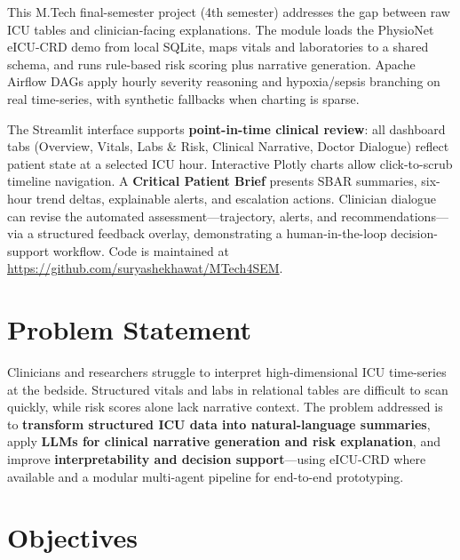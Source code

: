 \documentclass[12pt]{report}
\DeclareRobustCommand{\code}[1]{{\ttfamily\seqsplit{#1}\unskip}}
\begin{document}
This M.Tech final-semester project (4th semester) addresses the gap between raw ICU tables and clinician-facing explanations. The \code{icu\_agents} module loads the PhysioNet eICU-CRD demo from local SQLite, maps vitals and laboratories to a shared \code{PatientState} schema, and runs rule-based risk scoring plus narrative generation. Apache Airflow DAGs apply hourly severity reasoning and hypoxia/sepsis branching on real time-series, with synthetic fallbacks when charting is sparse.

The Streamlit interface supports \textbf{point-in-time clinical review}: all dashboard tabs (Overview, Vitals, Labs \& Risk, Clinical Narrative, Doctor Dialogue) reflect patient state at a selected ICU hour. Interactive Plotly charts allow click-to-scrub timeline navigation. A \textbf{Critical Patient Brief} presents SBAR summaries, six-hour trend deltas, explainable alerts, and escalation actions. Clinician dialogue can revise the automated assessment---trajectory, alerts, and recommendations---via a structured feedback overlay, demonstrating a human-in-the-loop decision-support workflow. Code is maintained at \url{https://github.com/suryashekhawat/MTech4SEM}.

\section{Problem Statement}

Clinicians and researchers struggle to interpret high-dimensional ICU time-series at the bedside. Structured vitals and labs in relational tables are difficult to scan quickly, while risk scores alone lack narrative context. The problem addressed is to \textbf{transform structured ICU data into natural-language summaries}, apply \textbf{LLMs for clinical narrative generation and risk explanation}, and improve \textbf{interpretability and decision support}---using eICU-CRD where available and a modular multi-agent pipeline for end-to-end prototyping.

\section{Objectives}
\end{document}
